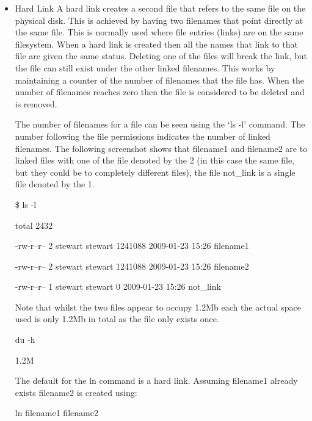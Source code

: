 \documentclass{article}
\begin{document}
\begin{itemize}
\item Hard Link
A hard link creates a second file that refers to the same file on the physical disk. This is achieved by having two filenames that point directly at the same file. This is normally used where file entries (links) are on the same filesystem. When a hard link is created then all the names that link to that file are given the same status. Deleting one of the files will break the link, but the file can still exist under the other linked filenames. This works by maintaining a counter of the number of filenames that the file has. When the number of filenames reaches zero then the file is considered to be deleted and is removed.

	The number of filenames for a file can be seen using the `ls -l' command. The number following the file permissions indicates the number of linked filenames. The following screenshot shows that filename1 and filename2 are to linked files with one of the file denoted by the 2 (in this case the same file, but they could be to completely different files), the file not\_link is a single file denoted by the 1.
	
\$ ls -l

\hspace{10mm} total 2432

\hspace{10mm}-rw-r--r-- 2 stewart stewart 1241088 2009-01-23 15:26 filename1

\hspace{10mm}-rw-r--r-- 2 stewart stewart 1241088 2009-01-23 15:26 filename2

\hspace{10mm}-rw-r--r-- 1 stewart stewart       0 2009-01-23 15:26 not\_link

\hspace{10mm}Note that whilst the two files appear to occupy 1.2Mb each the actual space used is only 1.2Mb in total as the file only exists once.

\hspace{15mm}du -h

\hspace{15mm}1.2M

\hspace{10mm}The default for the ln command is a hard link. Assuming filename1 already exists filename2 is created using:

\hspace{10mm}ln filename1 filename2


\end{itemize}
\end{document}
